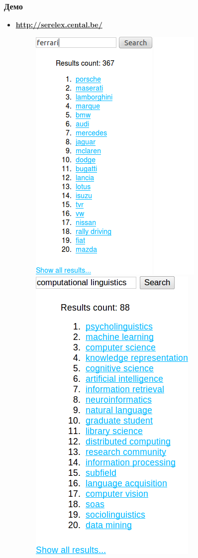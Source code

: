 \begin{frame}
\frametitle{Демо}

\begin{itemize}
  \item {\bf \url{http://serelex.cental.be/} }
  
\begin{figure}  
    \centering
        \includegraphics[height=0.6\textwidth]{figures/serelex}
        \includegraphics[height=0.5\textwidth]{figures/spacer}
        \includegraphics[height=0.6\textwidth]{figures/serelex-2}
        \end{figure}
\end{itemize}
\end{frame}


